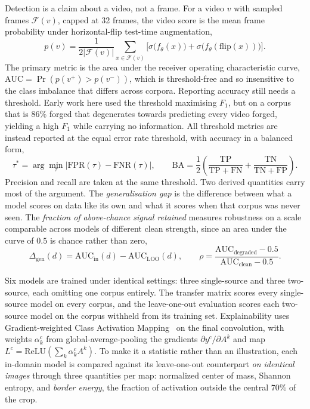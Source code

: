 \documentclass[journal,onecolumn]{IEEEtran}
\begin{document}
Detection is a claim about a video, not a frame. For a video $v$ with sampled
frames $\mathcal{F}(v)$, capped at 32 frames, the video score is the mean frame
probability under horizontal-flip test-time augmentation,
\begin{equation}
  p(v) = \frac{1}{2\lvert \mathcal{F}(v) \rvert}
  \sum_{x \in \mathcal{F}(v)}
  \Big[ \sigma\big(f_{\theta}(x)\big) + \sigma\big(f_{\theta}(\mathrm{flip}(x))\big) \Big].
  \label{eq:pool}
\end{equation}
The primary metric is the area under the receiver operating characteristic curve,
$\mathrm{AUC} = \Pr(p(v^{+}) > p(v^{-}))$, which is threshold-free and so
insensitive to the class imbalance that differs across corpora. Reporting
accuracy still needs a threshold. Early work here used the threshold maximising
$F_1$, but on a corpus that is 86\% forged that degenerates towards predicting
every video forged, yielding a high $F_1$ while carrying no information. All
threshold metrics are instead reported at the equal error rate threshold, with
accuracy in a balanced form,
\begin{equation}
  \tau^{*} = \arg\min_{\tau} \big\lvert \mathrm{FPR}(\tau) - \mathrm{FNR}(\tau) \big\rvert,
  \qquad
  \mathrm{BA} = \frac{1}{2}\left(
  \frac{\mathrm{TP}}{\mathrm{TP}+\mathrm{FN}} +
  \frac{\mathrm{TN}}{\mathrm{TN}+\mathrm{FP}} \right).
  \label{eq:eer}
\end{equation}
Precision and recall are taken at the same threshold. Two derived quantities
carry most of the argument. The \emph{generalisation gap} is the difference
between what a model scores on data like its own and what it scores when that
corpus was never seen. The \emph{fraction of above-chance signal retained}
measures robustness on a scale comparable across models of different clean
strength, since an area under the curve of $0.5$ is chance rather than zero,
\begin{equation}
  \Delta_{\text{gen}}(d) = \mathrm{AUC}_{\text{in}}(d) - \mathrm{AUC}_{\text{LOO}}(d),
  \qquad
  \rho = \frac{\mathrm{AUC}_{\text{degraded}} - 0.5}
              {\mathrm{AUC}_{\text{clean}} - 0.5}.
  \label{eq:gap}
\end{equation}

Six models are trained under identical settings: three single-source and three
two-source, each omitting one corpus entirely. The transfer matrix scores every
single-source model on every corpus, and the leave-one-out evaluation scores each
two-source model on the corpus withheld from its training set. Explainability
uses Gradient-weighted Class Activation Mapping~\cite{selvaraju2017gradcam} on
the final convolution, with weights $\alpha^{c}_{k}$ from global-average-pooling
the gradients $\partial y^{c} / \partial A^{k}$ and map
$L^{c} = \mathrm{ReLU}(\sum_{k}\alpha^{c}_{k} A^{k})$. To make it a statistic
rather than an illustration, each in-domain model is compared against its
leave-one-out counterpart \emph{on identical images} through three quantities per
map: normalized center of mass, Shannon entropy, and \emph{border energy}, the
fraction of activation outside the central 70\% of the crop.
\end{document}
